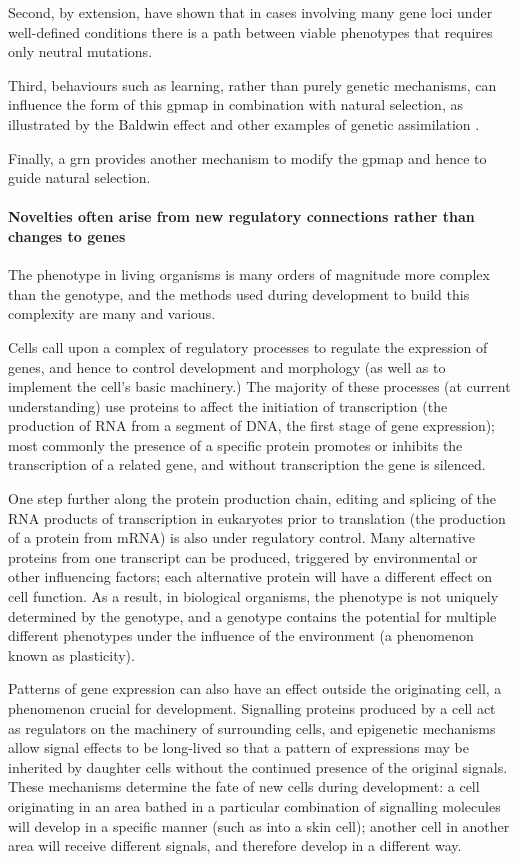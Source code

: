 Second, by extension, \textcite{Gavrilets:1997qt,Gravner:2007yd} have shown that in cases involving many gene loci under well-defined conditions there is a path between viable phenotypes that requires only neutral mutations.

Third, behaviours such as learning, rather than purely genetic mechanisms, can influence the form of this \gls{gpmap} in combination with natural selection, as illustrated by the Baldwin effect \parencite{Baldwin:1896ly} and other examples of genetic assimilation \parencite{Hinton:1987vy,Siegal:2002qn,Waddington:1942jb}.

Finally, a \gls{grn} provides another mechanism to modify the \gls{gpmap} and hence to guide natural selection.

\paragraph{Novelties often arise from new regulatory connections rather than changes to genes}

The phenotype in living organisms is many orders of magnitude more complex than the genotype, and the methods used during development to build this complexity are many and various.

Cells call upon a complex of regulatory processes to regulate the expression of genes, and hence to control development and morphology (as well as to implement the cell's basic machinery.) The majority of these processes (at current understanding) use proteins to affect the initiation of transcription (the production of RNA from a segment of DNA, the first stage of gene expression); most commonly the presence of a specific protein promotes or inhibits the transcription of a related gene, and without transcription the gene is silenced.

One step further along the protein production chain, editing and splicing of the RNA products of transcription in eukaryotes prior to translation (the production of a protein from mRNA) is also under regulatory control. Many alternative proteins from one transcript can be produced, triggered by environmental or other influencing factors; each alternative protein will have a different effect on cell function. As a result, in biological organisms, the phenotype is not uniquely determined by the genotype, and a genotype contains the potential for multiple different phenotypes under the influence of the environment (a phenomenon known as plasticity).

Patterns of gene expression can also have an effect outside the originating cell, a phenomenon crucial for development. Signalling proteins produced by a cell act as regulators on the machinery of surrounding cells, and epigenetic mechanisms allow signal effects to be long-lived so that a pattern of expressions may be inherited by daughter cells without the continued presence of the original signals. These mechanisms determine the fate of new cells during development: a cell originating in an area bathed in a particular combination of signalling molecules will develop in a specific manner (such as into a skin cell); another cell in another area will receive different signals, and therefore develop in a different way.

